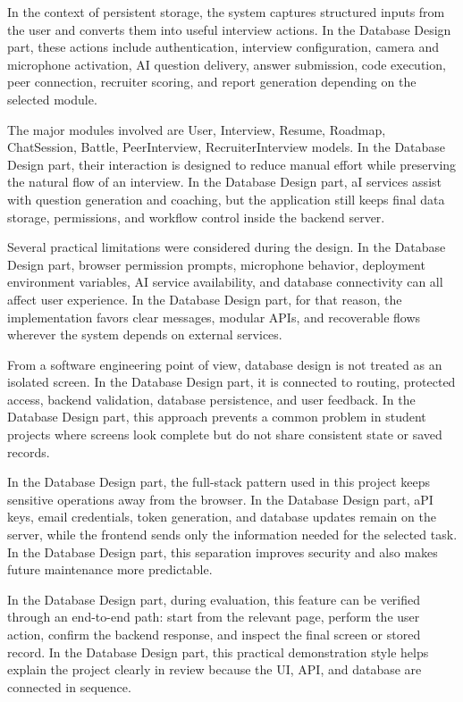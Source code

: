 \documentclass[12pt,a4paper]{report}
\begin{document}
In the context of persistent storage, the system captures structured inputs from the user and converts them into useful interview actions. In the Database Design part, these actions include authentication, interview configuration, camera and microphone activation, AI question delivery, answer submission, code execution, peer connection, recruiter scoring, and report generation depending on the selected module.


The major modules involved are User, Interview, Resume, Roadmap, ChatSession, Battle, PeerInterview, RecruiterInterview models. In the Database Design part, their interaction is designed to reduce manual effort while preserving the natural flow of an interview. In the Database Design part, aI services assist with question generation and coaching, but the application still keeps final data storage, permissions, and workflow control inside the backend server.


Several practical limitations were considered during the design. In the Database Design part, browser permission prompts, microphone behavior, deployment environment variables, AI service availability, and database connectivity can all affect user experience. In the Database Design part, for that reason, the implementation favors clear messages, modular APIs, and recoverable flows wherever the system depends on external services.


From a software engineering point of view, database design is not treated as an isolated screen. In the Database Design part, it is connected to routing, protected access, backend validation, database persistence, and user feedback. In the Database Design part, this approach prevents a common problem in student projects where screens look complete but do not share consistent state or saved records.


In the Database Design part, the full-stack pattern used in this project keeps sensitive operations away from the browser. In the Database Design part, aPI keys, email credentials, token generation, and database updates remain on the server, while the frontend sends only the information needed for the selected task. In the Database Design part, this separation improves security and also makes future maintenance more predictable.


In the Database Design part, during evaluation, this feature can be verified through an end-to-end path: start from the relevant page, perform the user action, confirm the backend response, and inspect the final screen or stored record. In the Database Design part, this practical demonstration style helps explain the project clearly in review because the UI, API, and database are connected in sequence.
\end{document}
